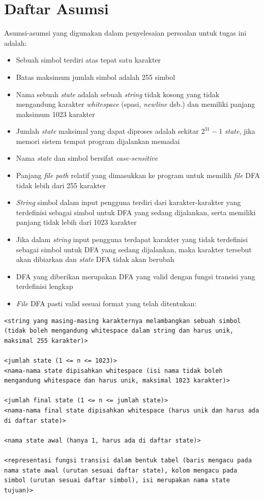 \documentclass[a4paper,titlepage]{article}
\begin{document}
	\section{Daftar Asumsi}

	Asumsi-asumsi yang digunakan dalam penyelesaian persoalan untuk tugas ini adalah:

		\begin{itemize}
			\item Sebuah simbol terdiri atas tepat satu karakter
			\item Batas maksimum jumlah simbol adalah 255 simbol
			\item Nama sebuah \textit{state} adalah sebuah \textit{string} tidak kosong yang tidak mengandung karakter \textit{whitespace} (spasi, \textit{newline} dsb.) dan memiliki panjang maksimum 1023 karakter
			\item Jumlah \textit{state} maksimal yang dapat diproses adalah sekitar $2^{31}-1$ \textit{state}, jika memori sistem tempat program dijalankan memadai
			\item Nama \textit{state} dan simbol bersifat \textit{case-sensitive}
			\item Panjang \textit{file path} relatif yang dimasukkan ke program untuk memilih \textit{file} DFA tidak lebih dari 255 karakter
			\item \textit{String} simbol dalam input pengguna terdiri dari karakter-karakter yang terdefinisi sebagai simbol untuk DFA yang sedang dijalankan, serta memiliki panjang tidak lebih dari 1023 karakter
			\item Jika dalam \textit{string} input pengguna terdapat karakter yang tidak terdefinisi sebagai simbol untuk DFA yang sedang dijalankan, maka karakter tersebut akan dibiarkan dan \textit{state} DFA tidak akan berubah
			\item DFA yang diberikan merupakan DFA yang valid dengan fungsi transisi yang terdefinisi lengkap
			\item \textit{File} DFA pasti valid sesuai format yang telah ditentukan:
		\end{itemize}

		\begin{lstlisting}
<string yang masing-masing karakternya melambangkan sebuah simbol (tidak boleh mengandung whitespace dalam string dan harus unik, maksimal 255 karakter)>

<jumlah state (1 <= n <= 1023)>
<nama-nama state dipisahkan whitespace (isi nama tidak boleh mengandung whitespace dan harus unik, maksimal 1023 karakter)>

<jumlah final state (1 <= n <= jumlah state)>
<nama-nama final state dipisahkan whitespace (harus unik dan harus ada di daftar state)>

<nama state awal (hanya 1, harus ada di daftar state)>

<representasi fungsi transisi dalam bentuk tabel (baris mengacu pada nama state awal (urutan sesuai daftar state), kolom mengacu pada simbol (urutan sesuai daftar simbol), isi merupakan nama state tujuan)>
		\end{lstlisting}
\end{document}
